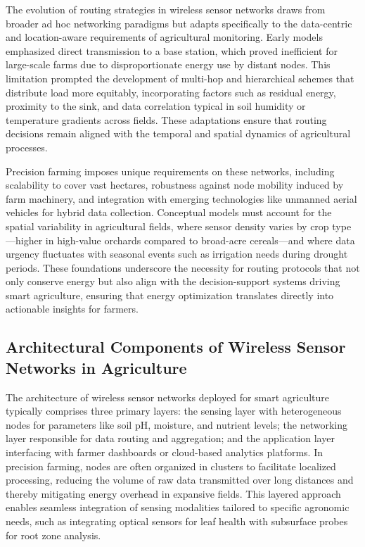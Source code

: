 \documentclass[12pt]{article}
\begin{document}
The evolution of routing strategies in wireless sensor networks draws from broader ad hoc networking paradigms but adapts specifically to the data-centric and location-aware requirements of agricultural monitoring. Early models emphasized direct transmission to a base station, which proved inefficient for large-scale farms due to disproportionate energy use by distant nodes. This limitation prompted the development of multi-hop and hierarchical schemes that distribute load more equitably, incorporating factors such as residual energy, proximity to the sink, and data correlation typical in soil humidity or temperature gradients across fields. These adaptations ensure that routing decisions remain aligned with the temporal and spatial dynamics of agricultural processes.

Precision farming imposes unique requirements on these networks, including scalability to cover vast hectares, robustness against node mobility induced by farm machinery, and integration with emerging technologies like unmanned aerial vehicles for hybrid data collection. Conceptual models must account for the spatial variability in agricultural fields, where sensor density varies by crop type—higher in high-value orchards compared to broad-acre cereals—and where data urgency fluctuates with seasonal events such as irrigation needs during drought periods. These foundations underscore the necessity for routing protocols that not only conserve energy but also align with the decision-support systems driving smart agriculture, ensuring that energy optimization translates directly into actionable insights for farmers.

\subsection{Architectural Components of Wireless Sensor Networks in Agriculture}

The architecture of wireless sensor networks deployed for smart agriculture typically comprises three primary layers: the sensing layer with heterogeneous nodes for parameters like soil pH, moisture, and nutrient levels; the networking layer responsible for data routing and aggregation; and the application layer interfacing with farmer dashboards or cloud-based analytics platforms. In precision farming, nodes are often organized in clusters to facilitate localized processing, reducing the volume of raw data transmitted over long distances and thereby mitigating energy overhead in expansive fields. This layered approach enables seamless integration of sensing modalities tailored to specific agronomic needs, such as integrating optical sensors for leaf health with subsurface probes for root zone analysis.
\end{document}
